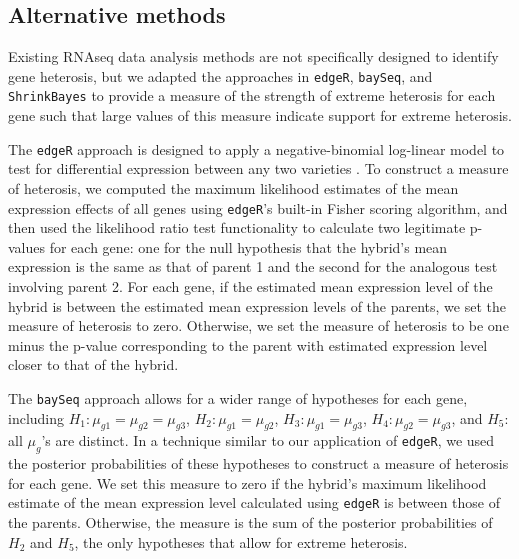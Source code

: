 \documentclass[useAMS,usenatbib,referee]{biom}
\begin{document}
\subsection{Alternative methods}
\label{s:alternative}

Existing RNAseq data analysis methods are not specifically designed to identify gene heterosis, but we adapted the approaches in {\tt edgeR}, {\tt baySeq}, and {\tt ShrinkBayes} to provide a measure of the strength of extreme heterosis for each gene such that large values of this measure indicate support for extreme heterosis.

The {\tt edgeR} approach is designed to apply a negative-binomial log-linear model to test for differential expression between any two varieties \citep{robinson2007moderated, robinson2010edgeR}. To construct a measure of heterosis, we computed the maximum likelihood estimates of the mean expression effects of all genes using {\tt edgeR}'s built-in Fisher scoring algorithm, and then used the likelihood ratio test functionality to calculate two legitimate p-values for each gene: one for the null hypothesis that the hybrid's mean expression is the same as that of parent 1 and the second for the analogous test involving parent 2. For each gene, if the estimated mean expression level of the hybrid is between the estimated mean expression levels of the parents, we set the measure of heterosis to zero. Otherwise, we set the measure of heterosis to be one minus the p-value corresponding to the parent with estimated expression level closer to that of the hybrid. 

The {\tt baySeq} approach \citep{hardcastle2010bayseq, hardcastle2012baySeq} allows for a wider range of hypotheses for each gene, including $H_1: \mu_{g1}=\mu_{g2}=\mu_{g3}$, $H_2: \mu_{g1}=\mu_{g2}$, $H_3: \mu_{g1}=\mu_{g3}$, $H_4: \mu_{g2}=\mu_{g3}$, and $H_5:$ all $\mu_g$'s are distinct. In a technique similar to our application of {\tt edgeR}, we used the posterior probabilities of these hypotheses to construct a measure of heterosis for each gene. We set this measure to zero if the hybrid's maximum likelihood estimate of the mean expression level calculated using {\tt edgeR} is between those of the parents. Otherwise, the measure is the sum of the posterior probabilities of $H_2$ and $H_5$, the only hypotheses that allow for extreme heterosis.
\end{document}
